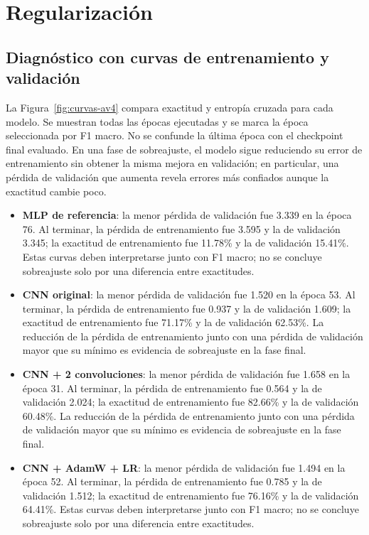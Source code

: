 \section{Regularización}

\subsection{Diagnóstico con curvas de entrenamiento y validación}

La Figura~\ref{fig:curvas-av4} compara exactitud y entropía cruzada para cada
modelo. Se muestran todas las épocas ejecutadas y se marca la época seleccionada
por F1 macro. No se confunde la última época con el checkpoint final evaluado.
En una fase de sobreajuste, el modelo sigue reduciendo su error de entrenamiento
sin obtener la misma mejora en validación; en particular, una pérdida de validación
que aumenta revela errores más confiados aunque la exactitud cambie poco.

\begin{itemize}
\item \textbf{MLP de referencia}: la menor pérdida de validación fue 3.339 en la época 76. Al terminar, la pérdida de entrenamiento fue 3.595 y la de validación 3.345; la exactitud de entrenamiento fue 11.78\% y la de validación 15.41\%. Estas curvas deben interpretarse junto con F1 macro; no se concluye sobreajuste solo por una diferencia entre exactitudes.
\item \textbf{CNN original}: la menor pérdida de validación fue 1.520 en la época 53. Al terminar, la pérdida de entrenamiento fue 0.937 y la de validación 1.609; la exactitud de entrenamiento fue 71.17\% y la de validación 62.53\%. La reducción de la pérdida de entrenamiento junto con una pérdida de validación mayor que su mínimo es evidencia de sobreajuste en la fase final.
\item \textbf{CNN + 2 convoluciones}: la menor pérdida de validación fue 1.658 en la época 31. Al terminar, la pérdida de entrenamiento fue 0.564 y la de validación 2.024; la exactitud de entrenamiento fue 82.66\% y la de validación 60.48\%. La reducción de la pérdida de entrenamiento junto con una pérdida de validación mayor que su mínimo es evidencia de sobreajuste en la fase final.
\item \textbf{CNN + AdamW + LR}: la menor pérdida de validación fue 1.494 en la época 52. Al terminar, la pérdida de entrenamiento fue 0.785 y la de validación 1.512; la exactitud de entrenamiento fue 76.16\% y la de validación 64.41\%. Estas curvas deben interpretarse junto con F1 macro; no se concluye sobreajuste solo por una diferencia entre exactitudes.
\end{itemize}

